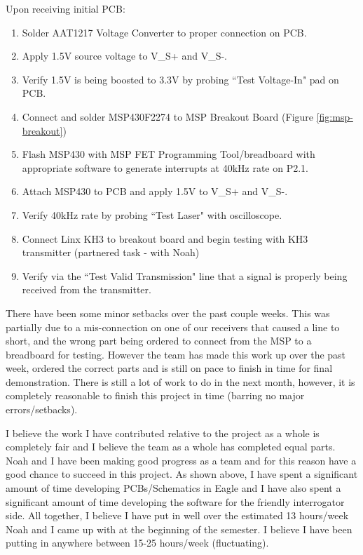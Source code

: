 \documentclass[letterpaper,10pt]{article}
\begin{document}
\begin{spacing}{1.15}
Upon receiving initial PCB:
\begin{enumerate}
	\item Solder AAT1217 Voltage Converter to proper connection on PCB.
	\item Apply 1.5V source voltage to V\_S+ and V\_S-.
	\item Verify 1.5V is being boosted to 3.3V by probing ``Test Voltage-In" pad on PCB.
	\item Connect and solder MSP430F2274 to MSP Breakout Board (Figure \ref{fig:msp-breakout})
	\item Flash MSP430 with MSP FET Programming Tool/breadboard with appropriate software to generate interrupts at 40kHz rate on P2.1.
	\item Attach MSP430 to PCB and apply 1.5V to V\_S+ and V\_S-.
	\item Verify 40kHz rate by probing ``Test Laser" with oscilloscope.
	\item Connect Linx KH3 to breakout board and begin testing with KH3 transmitter (partnered task - with Noah)
	\item Verify via the ``Test Valid Transmission" line that a signal is properly being received from the transmitter. 
	\end{enumerate}

There have been some minor setbacks over the past couple weeks. This was partially due to a mis-connection on one of our receivers that caused a line to short, and the wrong part being ordered to connect from the MSP to a breadboard for testing. However the team has made this work up over the past week, ordered the correct parts and is still on pace to finish in time for final demonstration. There is still a lot of work to do in the next month, however, it is completely reasonable to finish this project in time (barring no major errors/setbacks).

I believe the work I have contributed relative to the project as a whole is completely fair and I believe the team as a whole has completed equal parts. Noah and I have been making good progress as a team and for this reason have a good chance to succeed in this project. As shown above, I have spent a significant amount of time developing PCBs/Schematics in Eagle and I have also spent a significant amount of time developing the software for the friendly interrogator side. All together, I believe I have put in well over the estimated 13 hours/week Noah and I came up with at the beginning of the semester. I believe I have been putting in anywhere between 15-25 hours/week (fluctuating). 


\end{spacing}
\end{document}
